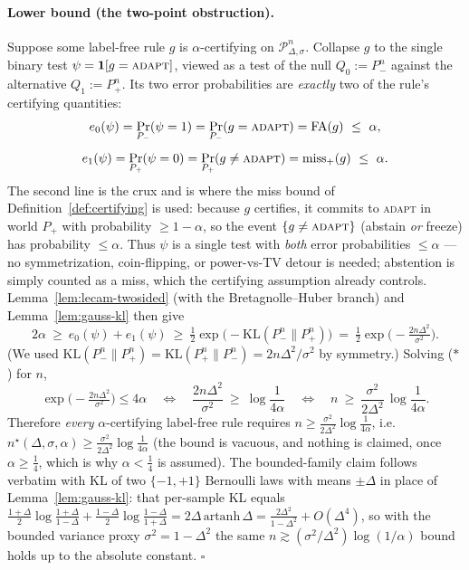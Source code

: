 \paragraph{Lower bound (the two-point obstruction).}
Suppose some label-free rule $g$ is $\alpha$-certifying on $\mathcal P^n_{\Delta,\sigma}$. Collapse
$g$ to the single binary test $\psi=\mathbf 1[g=\textsc{adapt}]$, viewed as a test of the null
$Q_0:=P^n_{-}$ against the alternative $Q_1:=P^n_{+}$. Its two error probabilities are
\emph{exactly} two of the rule's certifying quantities:
\[
   e_0(\psi)=\Pr_{P_-}(\psi=1)=\Pr_{P_-}(g=\textsc{adapt})=\mathrm{FA}(g)\ \le\ \alpha,
\]
\[
   e_1(\psi)=\Pr_{P_+}(\psi=0)=\Pr_{P_+}(g\neq\textsc{adapt})=\mathrm{miss}_+(g)\ \le\ \alpha .
\]
The second line is the crux and is where the miss bound of Definition~\ref{def:certifying} is
used: because $g$ certifies, it commits to \textsc{adapt} in world $P_+$ with probability
$\ge1-\alpha$, so the event $\{g\neq\textsc{adapt}\}$ (abstain \emph{or} freeze) has probability
$\le\alpha$. Thus $\psi$ is a single test with \emph{both} error probabilities $\le\alpha$ --- no
symmetrization, coin-flipping, or power-vs-TV detour is needed; abstention is simply counted as a
miss, which the certifying assumption already controls. Lemma~\ref{lem:lecam-twosided} (with the
Bretagnolle--Huber branch) and Lemma~\ref{lem:gauss-kl} then give
\[
   2\alpha\ \ge\ e_0(\psi)+e_1(\psi)\ \ge\ \tfrac12\exp\!\big(-\mathrm{KL}(P^n_-\|P^n_+)\big)
   \ =\ \tfrac12\exp\!\Big(-\tfrac{2n\Delta^2}{\sigma^2}\Big).
\tag{$\ast$}
\]
(We used $\mathrm{KL}(P^n_-\|P^n_+)=\mathrm{KL}(P^n_+\|P^n_-)=2n\Delta^2/\sigma^2$ by
symmetry.) Solving ($\ast$) for $n$,
\[
   \exp\!\Big(-\tfrac{2n\Delta^2}{\sigma^2}\Big)\le 4\alpha
   \quad\Longleftrightarrow\quad
   \frac{2n\Delta^2}{\sigma^2}\ \ge\ \log\frac1{4\alpha}
   \quad\Longleftrightarrow\quad
   n\ \ge\ \frac{\sigma^2}{2\Delta^2}\,\log\frac1{4\alpha}.
\]
Therefore \emph{every} $\alpha$-certifying label-free rule requires
$n\ge\tfrac{\sigma^2}{2\Delta^2}\log\frac1{4\alpha}$, i.e.\
$n^\star(\Delta,\sigma,\alpha)\ge\tfrac{\sigma^2}{2\Delta^2}\log\frac1{4\alpha}$ (the bound is
vacuous, and nothing is claimed, once $\alpha\ge\tfrac14$, which is why $\alpha<\tfrac14$ is
assumed). The bounded-family claim follows verbatim with $\mathrm{KL}$ of two $\{-1,+1\}$ Bernoulli
laws with means $\pm\Delta$ in place of Lemma~\ref{lem:gauss-kl}: that per-sample KL equals
$\tfrac{1+\Delta}{2}\log\tfrac{1+\Delta}{1-\Delta}+\tfrac{1-\Delta}{2}\log\tfrac{1-\Delta}{1+\Delta}
=2\Delta\,\mathrm{artanh}\,\Delta=\tfrac{2\Delta^2}{1-\Delta^2}+O(\Delta^4)$, so with the bounded
variance proxy $\sigma^2=1-\Delta^2$ the same $n\gtrsim(\sigma^2/\Delta^2)\log(1/\alpha)$ bound
holds up to the absolute constant. \hfill$\square$

